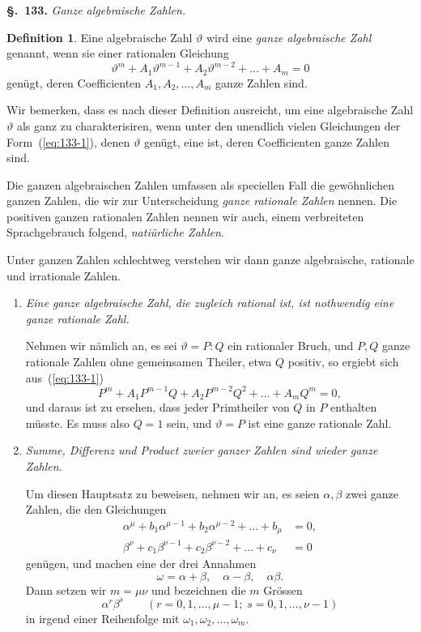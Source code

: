 \documentclass[12pt,a4paper]{article}
\theoremstyle{definition}
\newtheorem*{definition}{Definition}
\begin{document}
\noindent\textbf{\S.~133.}\quad
\textit{Ganze algebraische Zahlen.}\par\medskip

\begin{definition}
Eine algebraische Zahl $\vartheta$ wird eine \emph{ganze algebraische Zahl} genannt, wenn sie einer rationalen Gleichung
\begin{equation}\label{eq:133-1}
\vartheta^m + A_1\vartheta^{m-1} + A_2\vartheta^{m-2} + \dots + A_m = 0
\end{equation}
genügt, deren Coefficienten $A_1,A_2,\dots,A_m$ ganze Zahlen sind.
\end{definition}

Wir bemerken, dass es nach dieser Definition ausreicht, um eine algebraische Zahl $\vartheta$ als ganz zu charakterisiren, wenn unter den unendlich vielen Gleichungen der Form~(\ref{eq:133-1}), denen $\vartheta$ genügt, eine ist, deren Coefficienten ganze Zahlen sind.

Die ganzen algebraischen Zahlen umfassen als speciellen Fall die gewöhnlichen ganzen Zahlen, die wir zur Unterscheidung \emph{ganze rationale Zahlen} nennen. Die positiven ganzen rationalen Zahlen nennen wir auch, einem verbreiteten Sprachgebrauch folgend, \emph{natiürliche Zahlen}.

Unter ganzen Zahlen schlechtweg verstehen wir dann ganze algebraische, rationale und irrationale Zahlen.

\begin{enumerate}[label=\arabic*.]
\item \textit{Eine ganze algebraische Zahl, die zugleich rational ist, ist nothwendig eine ganze rationale Zahl.}

Nehmen wir nämlich an, es sei $\vartheta = P:Q$ ein rationaler Bruch, und $P,Q$ ganze rationale Zahlen ohne gemeinsamen Theiler, etwa $Q$ positiv, so ergiebt sich aus~(\ref{eq:133-1})
\[
P^m + A_1 P^{m-1}Q + A_2 P^{m-2}Q^2 + \dots + A_m Q^m = 0,
\]
und daraus ist zu ersehen, dass jeder Primtheiler von $Q$ in $P$ enthalten müsste. Es muss also $Q=1$ sein, und $\vartheta=P$ ist eine ganze rationale Zahl.

\item \textit{Summe, Differenz und Product zweier ganzer Zahlen sind wieder ganze Zahlen.}

Um diesen Hauptsatz zu beweisen, nehmen wir an, es seien $\alpha,\beta$ zwei ganze Zahlen, die den Gleichungen
\begin{equation}\label{eq:133-2}
\begin{aligned}
\alpha^\mu + b_1\alpha^{\mu-1} + b_2\alpha^{\mu-2} + \dots + b_\mu &= 0,\\
\beta^\nu + c_1\beta^{\nu-1} + c_2\beta^{\nu-2} + \dots + c_\nu &= 0
\end{aligned}
\end{equation}
genügen, und machen eine der drei Annahmen
\[
\omega = \alpha+\beta,\quad \alpha-\beta,\quad \alpha\beta.
\]
Dann setzen wir $m=\mu\nu$ und bezeichnen die $m$ Grössen
\[
\alpha^r\beta^s \qquad (r=0,1,\dots,\mu-1;\; s=0,1,\dots,\nu-1)
\]
in irgend einer Reihenfolge mit $\omega_1,\omega_2,\dots,\omega_m$.
\end{enumerate}
\end{document}
